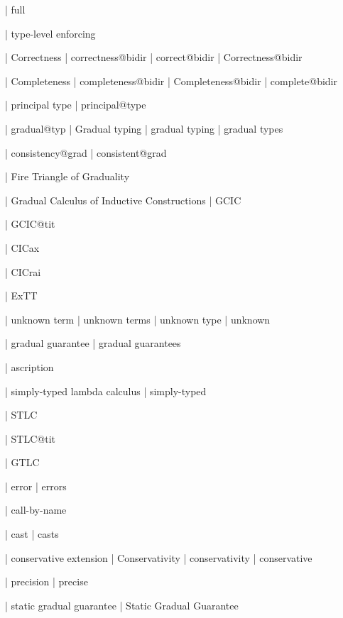   | full

  | type-level enforcing

  | Correctness
  | correctness@bidir
  | correct@bidir
  | Correctness@bidir

  | Completeness
  | completeness@bidir
  | Completeness@bidir
  | complete@bidir


  | principal type
  | principal@type



  | gradual@typ
  | Gradual typing
  | gradual typing
  | gradual types

  | consistency@grad
  | consistent@grad

  | Fire Triangle of Graduality

  | Gradual Calculus of Inductive Constructions
  | GCIC

  | GCIC@tit


  | CICax

  | CICrai

  | ExTT

  | unknown term
  | unknown terms
  | unknown type
  | unknown

  | gradual guarantee
  | gradual guarantees

  | ascription

  | simply-typed lambda calculus
  | simply-typed

  | STLC

  | STLC@tit

  | GTLC

  | error
  | errors

  | call-by-name

  | cast
  | casts

  | conservative extension
  | Conservativity
  | conservativity
  | conservative

  | precision
  | precise

  | static gradual guarantee
  | Static Gradual Guarantee


